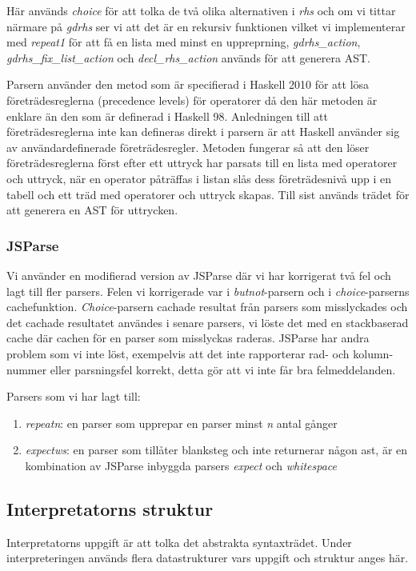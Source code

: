 Här används \emph{choice} för att tolka de två olika alternativen i \emph{rhs} och om vi tittar närmare på \emph{gdrhs} 
ser vi att det är en rekursiv funktionen vilket vi implementerar med \emph{repeat1} för att få en lista med minst en uppreprning, 
\emph{gdrhs\_action}, \emph{gdrhs\_fix\_list\_action} och \emph{decl\_rhs\_action} används för att generera AST.

Parsern använder den metod som är specifierad i Haskell 2010 \citep{haskell2010} för att lösa företrädesreglerna (precedence levels) för operatorer då den här metoden är enklare än den som är definerad i Haskell 98. 
Anledningen till att företrädesreglerna inte kan defineras direkt i parsern är att Haskell använder sig av användardefinerade företrädesregler.
Metoden fungerar så att den löser företrädesreglerna först efter ett uttryck har parsats till en lista med operatorer 
och uttryck, när en operator påträffas i listan slås dess företrädesnivå upp i en tabell och ett träd med 
operatorer och uttryck skapas. Till sist används trädet för att generera en AST för uttrycken.

\subsubsection{JSParse}
Vi använder en modifierad version av JSParse där vi har korrigerat två fel och lagt till fler parsers. Felen vi korrigerade var i \emph{butnot}-parsern och i \emph{choice}-parserns cachefunktion. 
\emph{Choice}-parsern cachade resultat från parsers som misslyckades och det cachade resultatet användes i senare parsers, 
vi löste det med en stackbaserad cache där cachen för en parser som misslyckas raderas. 
JSParse har andra problem som vi inte löst, exempelvis att det inte rapporterar rad- och kolumn-nummer eller parsningsfel korrekt, detta gör att vi inte får bra felmeddelanden.

Parsers som vi har lagt till:
\begin{enumerate}
    \item{\emph{repeatn}: en parser som upprepar en parser minst \emph{n} antal gånger}
    \item{\emph{expectws}: en parser som tillåter blanksteg och inte returnerar någon ast, är en kombination av JSParse inbyggda parsers \emph{expect} och \emph{whitespace}}
\end{enumerate}



\subsection{Interpretatorns struktur}
Interpretatorns uppgift är att tolka det abstrakta syntaxträdet. Under interpreteringen används flera datastrukturer vars uppgift och struktur anges här.

